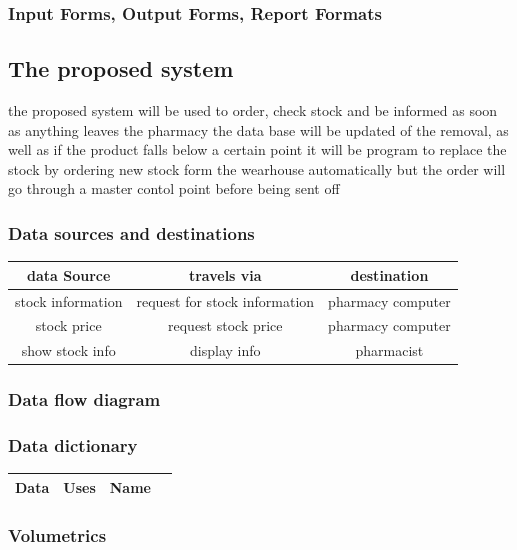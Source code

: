\subsubsection{Input Forms, Output Forms, Report Formats}

\subsection{The proposed system}
the proposed system will be used to order, check stock and be informed as soon as anything leaves the pharmacy the data base will be updated of the removal, as well as if the product falls below a certain point it will be program to replace the stock by ordering new stock form the wearhouse automatically but the order will go through a master contol point before being sent off 
\subsubsection{Data sources and destinations}
\begin{table}
\begin{tabular}{|c|c|c|}
\hline\hline
data Source & travels via & destination\\
\hline
stock information & request for stock information & pharmacy computer\\
\hline
stock price & request stock price & pharmacy computer\\
\hline
show stock info & display info & pharmacist\\ 
\hline
\end{tabular}
\label{table:nonlin}

\end{table}
\subsubsection{Data flow diagram}

\subsubsection{Data dictionary}
\begin{table}
\begin{tabular}{|c|c|c|c|}
\hline
Data & Uses & Name \\
\hline

\end{tabular}
\label{table:nonlin}
\end{table}

\subsubsection{Volumetrics}

